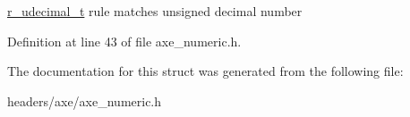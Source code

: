 \hyperlink{structaxe_1_1r__udecimal__t}{r\+\_\+udecimal\+\_\+t} rule matches unsigned decimal number 

Definition at line 43 of file axe\+\_\+numeric.\+h.



The documentation for this struct was generated from the following file\+:\begin{DoxyCompactItemize}
\item 
headers/axe/axe\+\_\+numeric.\+h\end{DoxyCompactItemize}
